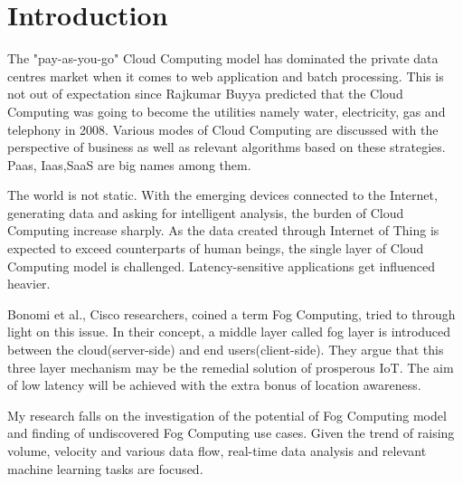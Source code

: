 \chapter{Introduction}
The "pay-as-you-go" Cloud Computing model has dominated the private data centres market when it comes to web application and batch processing.\cite{bonomi2012fog} This is not out of expectation since Rajkumar Buyya predicted that the Cloud Computing was going to become the utilities namely water, electricity, gas and telephony in 2008.\cite{buyya2009cloud} Various modes of Cloud Computing are discussed with the perspective of business as well as relevant algorithms based on these strategies. Paas, Iaas,SaaS are big names among them.

The world is not static. With the emerging devices connected to the Internet, generating data and asking for intelligent analysis, the burden of Cloud Computing increase sharply. As the data created through Internet of Thing is expected to exceed counterparts of human beings, the single layer of Cloud Computing model is challenged. Latency-sensitive applications get influenced heavier.

Bonomi et al., Cisco researchers, coined a term Fog Computing, tried to through light on this issue. In their concept, a middle layer called fog layer is introduced between the cloud(server-side) and end users(client-side). They argue that this three layer mechanism may be the remedial solution of prosperous IoT. The aim of low latency will be achieved with the extra bonus of location awareness.

My research falls on the investigation of the potential of Fog Computing model and finding of undiscovered Fog Computing use cases. Given the trend of raising volume, velocity and various data flow, real-time data analysis and relevant machine learning tasks are focused.